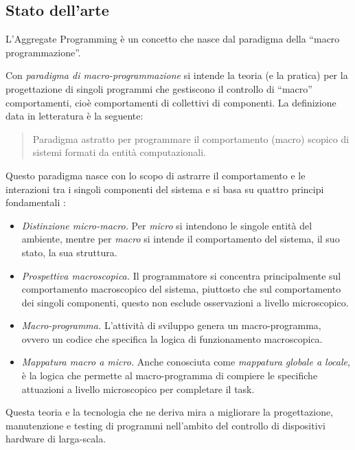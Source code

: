 \documentclass[12pt,a4paper,openright,twoside]{book}
\begin{document}
\subsection{Stato dell'arte}

L'Aggregate Programming è un concetto che nasce dal paradigma della ``macro programmazione''.

Con \textit{paradigma di macro-programmazione} si intende la teoria (e la pratica) per la progettazione di singoli programmi che gestiscono il controllo di ``macro'' comportamenti, cioè comportamenti di collettivi di componenti. La definizione data in letteratura è  la seguente:

\begin{quote}
    Paradigma astratto per programmare il comportamento (macro) scopico di sistemi formati da entità computazionali. \cite{Casadei2023}
\end{quote}

Questo paradigma nasce con lo scopo di astrarre il comportamento e le interazioni tra i singoli componenti del sistema e si basa su quattro principi fondamentali \cite{Casadei2023}:

\begin{itemize}
    \item \textit{Distinzione micro-macro.} Per \textit{micro} si intendono le singole entità del ambiente, mentre per \textit{macro} si intende il comportamento del sistema, il suo stato, la sua struttura.
    \item \textit{Prospettiva macroscopica.} Il programmatore si concentra principalmente sul comportamento macroscopico del sistema, piuttosto che sul comportamento dei singoli componenti, questo non esclude osservazioni a livello microscopico.
    \item \textit{Macro-programma.} L'attività di sviluppo genera un macro-programma, ovvero un codice che specifica la logica di funzionamento macroscopica.
    \item \textit{Mappatura macro a micro.} Anche conosciuta come \textit{mappatura globale a locale}, è la logica che permette al macro-programma di compiere le specifiche attuazioni a livello microscopico per completare il task.
\end{itemize}

Questa teoria e la tecnologia che ne deriva mira a migliorare la progettazione, manutenzione e testing di programmi nell'ambito del controllo di dispositivi hardware di larga-scala. 
\end{document}
